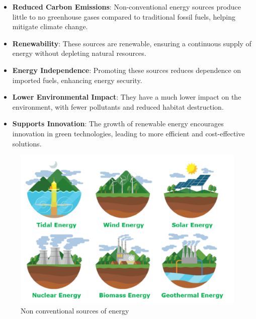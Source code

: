 \documentclass[11pt]{article}
\begin{document}
\begin{itemize}
	\item \textbf{Reduced Carbon Emissions}: Non-conventional energy sources produce little to no greenhouse gases compared to traditional fossil fuels, helping mitigate climate change.
	\item \textbf{Renewability}: These sources are renewable, ensuring a continuous supply of energy without depleting natural resources.
	\item \textbf{Energy Independence}: Promoting these sources reduces dependence on imported fuels, enhancing energy security.
	\item \textbf{Lower Environmental Impact}: They have a much lower impact on the environment, with fewer pollutants and reduced habitat destruction.
	\item \textbf{Supports Innovation}: The growth of renewable energy encourages innovation in green technologies, leading to more efficient and cost-effective solutions.
\end{itemize}

\begin{figure}[H]
	\centering
	\includegraphics[width=.65\textwidth]{Sourcesofenergy5.png}
	\caption{Non conventional sources of energy}
\end{figure}
\end{document}
